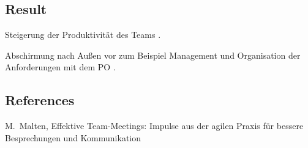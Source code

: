 \documentclass[5pt, final]{beamer}
\begin{document}
\begin{frame}[t]
\begin{multicols}{3}
			\section{Result}
			
			Steigerung der Produktivität des Teams \cite{vantighem24}.
			
			Abschirmung nach Außen vor zum Beispiel Management und Organisation der Anforderungen mit dem PO \cite{meindl12}.
			
			
			
			
			\subsection{References}
						
			\begin{thebibliography}{99}
				
%				
%				
				
				 M.~Malten, Effektive Team-Meetings: Impulse aus der agilen Praxis für bessere Besprechungen und Kommunikation
				

\end{thebibliography}
\end{multicols}
\end{frame}
\end{document}
